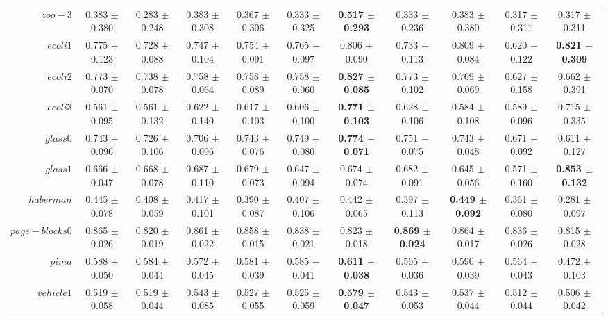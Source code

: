 \begin{table}[!ht]
{\begin{tabular}{r c c c c c c c c c c}
$zoo-3$ & 0.383 $\pm$ 0.380 & 0.283 $\pm$ 0.248 & 0.383 $\pm$ 0.308 & 0.367 $\pm$ 0.306 & 0.333 $\pm$ 0.325 & \textbf{0.517 $\pm$ 0.293} & 0.333 $\pm$ 0.236 & 0.383 $\pm$ 0.380 & 0.317 $\pm$ 0.311 & 0.317 $\pm$ 0.311 \\
$ecoli1$ & 0.775 $\pm$ 0.123 & 0.728 $\pm$ 0.088 & 0.747 $\pm$ 0.104 & 0.754 $\pm$ 0.091 & 0.765 $\pm$ 0.097 & 0.806 $\pm$ 0.090 & 0.733 $\pm$ 0.113 & 0.809 $\pm$ 0.084 & 0.620 $\pm$ 0.122 & \textbf{0.821 $\pm$ 0.309} \\
$ecoli2$ & 0.773 $\pm$ 0.070 & 0.738 $\pm$ 0.078 & 0.758 $\pm$ 0.064 & 0.758 $\pm$ 0.089 & 0.758 $\pm$ 0.060 & \textbf{0.827 $\pm$ 0.085} & 0.773 $\pm$ 0.102 & 0.769 $\pm$ 0.069 & 0.627 $\pm$ 0.158 & 0.662 $\pm$ 0.391 \\
$ecoli3$ & 0.561 $\pm$ 0.095 & 0.561 $\pm$ 0.132 & 0.622 $\pm$ 0.140 & 0.617 $\pm$ 0.103 & 0.606 $\pm$ 0.100 & \textbf{0.771 $\pm$ 0.103} & 0.628 $\pm$ 0.106 & 0.584 $\pm$ 0.108 & 0.589 $\pm$ 0.096 & 0.715 $\pm$ 0.335 \\
$glass0$ & 0.743 $\pm$ 0.096 & 0.726 $\pm$ 0.106 & 0.706 $\pm$ 0.096 & 0.743 $\pm$ 0.076 & 0.749 $\pm$ 0.080 & \textbf{0.774 $\pm$ 0.071} & 0.751 $\pm$ 0.075 & 0.743 $\pm$ 0.048 & 0.671 $\pm$ 0.092 & 0.611 $\pm$ 0.127 \\
$glass1$ & 0.666 $\pm$ 0.047 & 0.668 $\pm$ 0.078 & 0.687 $\pm$ 0.110 & 0.679 $\pm$ 0.073 & 0.647 $\pm$ 0.094 & 0.674 $\pm$ 0.074 & 0.682 $\pm$ 0.091 & 0.645 $\pm$ 0.056 & 0.571 $\pm$ 0.160 & \textbf{0.853 $\pm$ 0.132} \\
$haberman$ & 0.445 $\pm$ 0.078 & 0.408 $\pm$ 0.059 & 0.417 $\pm$ 0.101 & 0.390 $\pm$ 0.087 & 0.407 $\pm$ 0.106 & 0.442 $\pm$ 0.065 & 0.397 $\pm$ 0.113 & \textbf{0.449 $\pm$ 0.092} & 0.361 $\pm$ 0.080 & 0.281 $\pm$ 0.097 \\
$page-blocks0$ & 0.865 $\pm$ 0.026 & 0.820 $\pm$ 0.019 & 0.861 $\pm$ 0.022 & 0.858 $\pm$ 0.015 & 0.838 $\pm$ 0.021 & 0.823 $\pm$ 0.018 & \textbf{0.869 $\pm$ 0.024} & 0.864 $\pm$ 0.017 & 0.836 $\pm$ 0.026 & 0.815 $\pm$ 0.028 \\
$pima$ & 0.588 $\pm$ 0.050 & 0.584 $\pm$ 0.044 & 0.572 $\pm$ 0.045 & 0.581 $\pm$ 0.039 & 0.585 $\pm$ 0.041 & \textbf{0.611 $\pm$ 0.038} & 0.565 $\pm$ 0.036 & 0.590 $\pm$ 0.039 & 0.564 $\pm$ 0.043 & 0.472 $\pm$ 0.103 \\
$vehicle1$ & 0.519 $\pm$ 0.058 & 0.519 $\pm$ 0.044 & 0.543 $\pm$ 0.085 & 0.527 $\pm$ 0.055 & 0.525 $\pm$ 0.059 & \textbf{0.579 $\pm$ 0.047} & 0.543 $\pm$ 0.053 & 0.537 $\pm$ 0.044 & 0.512 $\pm$ 0.044 & 0.506 $\pm$ 0.042 \\

\end{tabular}}
\end{table}
